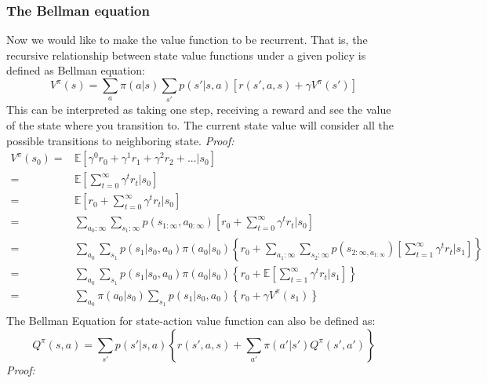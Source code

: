 \documentclass[11pt]{article}
\begin{document}
\subsubsection{The Bellman equation}
Now we would like to make the value function to be recurrent. That is, the recursive relationship between state value functions under a given policy is defined as Bellman equation:
%
$$V^{\pi}(s) = \sum_a \pi(a|s)\sum_{s'} p(s'|s,a) [r(s', a, s) + \gamma V^{\pi}(s')]$$
%
This can be interpreted as taking one step, receiving a reward and see the value of the state where you transition to. The current state value will consider all the possible transitions to neighboring state.
\noindent\textit{Proof:}
\begin{equation}
\begin{split}
V^{\pi}(s_0) = & \mathbb{E} \left[\gamma^0 r_0 + \gamma^1 r_1+\gamma^2 r_2+...\bigg|s_0\right]\nonumber\\    
= & \mathbb{E}\left[\sum_{t=0}^{\infty} \gamma^t r_t\bigg|s_0\right]\\
= & \mathbb{E}\left[r_0+\sum_{t=0}^{\infty} \gamma^t r_t\bigg|s_0\right]\\
= & \sum_{a_0:\infty} \sum_{s_1:\infty} p(s_{1:\infty},a_{0:\infty}) \left[r_0+\sum_{t=0}^{\infty} \gamma^t r_t\bigg|s_0\right]\\
= & \sum_{a_0} \sum_{s_1} p(s_1|s_{0},a_{0})\pi(a_0|s_0) \left\{r_0+ \sum_{a_1:\infty} \sum_{s_2:\infty} p(s_{2:\infty,a_{1:\infty}}) \left[\sum_{t=1}^{\infty} \gamma^t r_t\bigg|s_1\right]\right\}\\
= & \sum_{a_0} \sum_{s_1}p(s_1|s_{0},a_{0})\pi(a_0|s_0) \left\{r_0+ \mathbb{E} \left[\sum_{t=1}^{\infty} \gamma^t r_t\bigg|s_1\right]\right\}\\
= & \sum_{a_0} \pi(a_0|s_0) \sum_{s_1} p(s_1|s_{0},a_{0}) \left\{r_0+ \gamma V^{\pi} (s_1)\right\}\\
\end{split}
\end{equation}
%
The Bellman Equation for state-action value function can also be defined as:
$$Q^{\pi}(s,a) = \sum_{s'} p(s'|s,a) \left\{r(s',a,s) + \sum_{a'} \pi(a'|s') Q^{\pi}(s',a')\right\}$$
\noindent\textit{Proof:}
\end{document}
